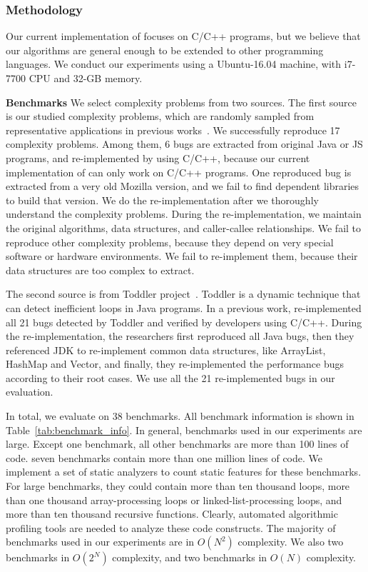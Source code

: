 \subsubsection{Methodology}
Our current implementation of \Tool focuses on C/C++ programs, 
but we believe that our algorithms are general enough to be extended 
to other programming languages.
We conduct our experiments using a Ubuntu-16.04 machine, 
with i7-7700 CPU and 32-GB memory. 


%

\textbf{Benchmarks}
We select complexity problems from two sources. 
The first source is our studied complexity problems, 
which are randomly sampled from representative applications in previous works~\cite{PerfBug,SongOOPSLA2014}.
We successfully reproduce 17 complexity problems. 
Among them, 6 bugs are extracted from original Java or JS programs, 
and re-implemented by using C/C++, 
because our current implementation of \Tool can only work on C/C++ programs.
One reproduced bug is extracted from a very old Mozilla version, 
and we fail to find dependent libraries to build that version. 
We do the re-implementation after we thoroughly understand the complexity problems.
During the re-implementation, we maintain the original algorithms, 
data structures, and caller-callee relationships. 
We fail to reproduce other complexity problems, 
because they depend on very special software or hardware environments.
We fail to re-implement them, 
because their data structures are too complex to extract.

The second source is from Toddler project~\cite{Alabama}. 
Toddler is a dynamic technique that can detect inefficient loops in Java programs.
In a previous work, \citet{ldoctor} re-implemented all 
21 bugs detected by Toddler and verified by developers using C/C++.
During the re-implementation, the researchers first reproduced all Java bugs, 
then they referenced JDK to re-implement 
common data structures, like ArrayList, HashMap and Vector, 
and finally, they re-implemented the performance bugs according to their root cases. 
We use all the 21 re-implemented bugs in our evaluation.  

In total, we evaluate \Tool on 38 benchmarks. 
All benchmark information is shown in Table~\ref{tab:benchmark_info}.
In general, benchmarks used in our experiments are large. 
Except one benchmark, all other benchmarks are more than 100 lines of code. 
seven benchmarks contain more than one million lines of code. 
We implement a set of static analyzers to count static features for these benchmarks. 
For large benchmarks, 
they could contain more than ten thousand loops, more than one 
thousand array-processing loops or linked-list-processing loops, 
and more than ten thousand recursive functions. 
Clearly, automated algorithmic profiling tools are needed to analyze these code constructs. 
The majority of benchmarks used in our experiments are in $O(N^2)$ complexity. 
We also two benchmarks in $O(2^N)$ complexity, 
and two benchmarks in $O(N)$ complexity. 

